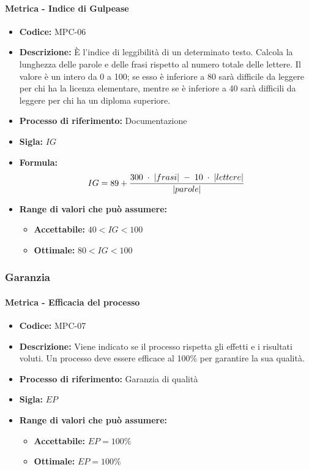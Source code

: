     \paragraph{Metrica - Indice di Gulpease}
    \begin{itemize}
        \item \textbf{Codice:} MPC-06
        \item \textbf{Descrizione:} È l'indice di leggibilità di un determinato testo. Calcola la lunghezza delle parole e delle frasi rispetto al numero totale delle lettere. Il valore è un intero da 0 a 100; se esso è inferiore a 80 sarà difficile da leggere per chi ha la licenza elementare, mentre se è inferiore a 40 sarà difficili da leggere per chi ha un diploma superiore.
        \item \textbf{Processo di riferimento:} Documentazione
        \item \textbf{Sigla:} $IG$
        \item \textbf{Formula:} $$IG = 89 + {{300 \; \cdot \; |frasi| \; - \; 10 \; \cdot \; |lettere|}\over |parole|}$$
        \item \textbf{Range di valori che può assumere:}
        \begin{itemize}
            \item \textbf{Accettabile:} $40 < IG < 100$
            \item \textbf{Ottimale:} $80 < IG < 100$
        \end{itemize}
    \end{itemize}

\subsubsection{Garanzia}
    \paragraph{Metrica - Efficacia del processo}
    \begin{itemize}
        \item \textbf{Codice:} MPC-07
        \item \textbf{Descrizione:} Viene indicato se il processo rispetta gli effetti e i risultati voluti. Un processo deve essere efficace al 100\% per garantire la sua qualità.
        \item \textbf{Processo di riferimento:} Garanzia di qualità
        \item \textbf{Sigla:} $EP$
        \item \textbf{Range di valori che può assumere:}
        \begin{itemize}
            \item \textbf{Accettabile:} $EP = 100\%$
            \item \textbf{Ottimale:} $EP = 100\%$
        \end{itemize}
    \end{itemize}

